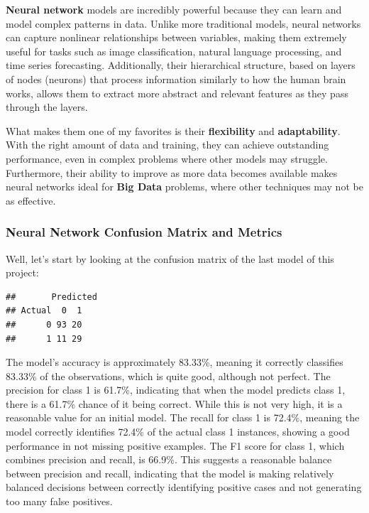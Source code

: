 \documentclass[
]{article}
\begin{document}
\textbf{Neural network} models are incredibly powerful because they can
learn and model complex patterns in data. Unlike more traditional
models, neural networks can capture nonlinear relationships between
variables, making them extremely useful for tasks such as image
classification, natural language processing, and time series
forecasting. Additionally, their hierarchical structure, based on layers
of nodes (neurons) that process information similarly to how the human
brain works, allows them to extract more abstract and relevant features
as they pass through the layers.

What makes them one of my favorites is their \textbf{flexibility} and
\textbf{adaptability}. With the right amount of data and training, they
can achieve outstanding performance, even in complex problems where
other models may struggle. Furthermore, their ability to improve as more
data becomes available makes neural networks ideal for \textbf{Big Data}
problems, where other techniques may not be as effective.

\subsubsection{Neural Network Confusion Matrix and
Metrics}\label{neural-network-confusion-matrix-and-metrics}

Well, let's start by looking at the confusion matrix of the last model
of this project:

\begin{verbatim}
##       Predicted
## Actual  0  1
##      0 93 20
##      1 11 29
\end{verbatim}

The model's accuracy is approximately 83.33\%, meaning it correctly
classifies 83.33\% of the observations, which is quite good, although
not perfect. The precision for class 1 is 61.7\%, indicating that when
the model predicts class 1, there is a 61.7\% chance of it being
correct. While this is not very high, it is a reasonable value for an
initial model. The recall for class 1 is 72.4\%, meaning the model
correctly identifies 72.4\% of the actual class 1 instances, showing a
good performance in not missing positive examples. The F1 score for
class 1, which combines precision and recall, is 66.9\%. This suggests a
reasonable balance between precision and recall, indicating that the
model is making relatively balanced decisions between correctly
identifying positive cases and not generating too many false positives.
\end{document}
